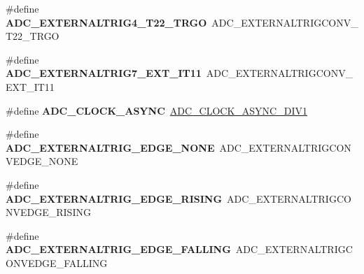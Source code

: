 \begin{DoxyCompactItemize}
\item 
\mbox{\label{group___h_a_l___a_d_c___aliased___defines_ga671cb20b99d24f3c9923ac7777e5f84e}} 
\#define {\bfseries A\+D\+C\+\_\+\+E\+X\+T\+E\+R\+N\+A\+L\+T\+R\+I\+G4\+\_\+\+T22\+\_\+\+T\+R\+GO}~A\+D\+C\+\_\+\+E\+X\+T\+E\+R\+N\+A\+L\+T\+R\+I\+G\+C\+O\+N\+V\+\_\+\+T22\+\_\+\+T\+R\+GO
\item 
\mbox{\label{group___h_a_l___a_d_c___aliased___defines_ga54407c5dc446f7d5425d8ac135bee69e}} 
\#define {\bfseries A\+D\+C\+\_\+\+E\+X\+T\+E\+R\+N\+A\+L\+T\+R\+I\+G7\+\_\+\+E\+X\+T\+\_\+\+I\+T11}~A\+D\+C\+\_\+\+E\+X\+T\+E\+R\+N\+A\+L\+T\+R\+I\+G\+C\+O\+N\+V\+\_\+\+E\+X\+T\+\_\+\+I\+T11
\item 
\mbox{\label{group___h_a_l___a_d_c___aliased___defines_gae507056750621dbc26572874e89ef791}} 
\#define {\bfseries A\+D\+C\+\_\+\+C\+L\+O\+C\+K\+\_\+\+A\+S\+Y\+NC}~\hyperlink{group___a_d_c___clock_prescaler_ga092c0277fd6db9b905d229c9f8dda8ab}{A\+D\+C\+\_\+\+C\+L\+O\+C\+K\+\_\+\+A\+S\+Y\+N\+C\+\_\+\+D\+I\+V1}
\item 
\mbox{\label{group___h_a_l___a_d_c___aliased___defines_ga324129b8c65e1f89b0002c31297935eb}} 
\#define {\bfseries A\+D\+C\+\_\+\+E\+X\+T\+E\+R\+N\+A\+L\+T\+R\+I\+G\+\_\+\+E\+D\+G\+E\+\_\+\+N\+O\+NE}~A\+D\+C\+\_\+\+E\+X\+T\+E\+R\+N\+A\+L\+T\+R\+I\+G\+C\+O\+N\+V\+E\+D\+G\+E\+\_\+\+N\+O\+NE
\item 
\mbox{\label{group___h_a_l___a_d_c___aliased___defines_ga7955225cafbadae21be3c9eaaab4bd58}} 
\#define {\bfseries A\+D\+C\+\_\+\+E\+X\+T\+E\+R\+N\+A\+L\+T\+R\+I\+G\+\_\+\+E\+D\+G\+E\+\_\+\+R\+I\+S\+I\+NG}~A\+D\+C\+\_\+\+E\+X\+T\+E\+R\+N\+A\+L\+T\+R\+I\+G\+C\+O\+N\+V\+E\+D\+G\+E\+\_\+\+R\+I\+S\+I\+NG
\item 
\mbox{\label{group___h_a_l___a_d_c___aliased___defines_ga0b539c9290d819da8932016f4a4ca2a1}} 
\#define {\bfseries A\+D\+C\+\_\+\+E\+X\+T\+E\+R\+N\+A\+L\+T\+R\+I\+G\+\_\+\+E\+D\+G\+E\+\_\+\+F\+A\+L\+L\+I\+NG}~A\+D\+C\+\_\+\+E\+X\+T\+E\+R\+N\+A\+L\+T\+R\+I\+G\+C\+O\+N\+V\+E\+D\+G\+E\+\_\+\+F\+A\+L\+L\+I\+NG
\item 

\end{DoxyCompactItemize}
